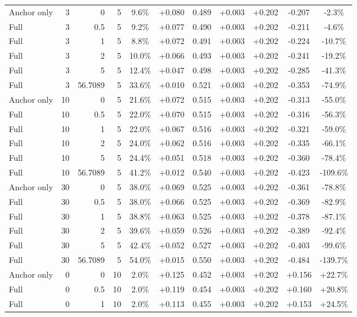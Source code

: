 \begin{table}[htbp]
\begin{tabular}{lrrrccccccc}
Anchor only & 3 & 0 & 5 & 9.6\% & +0.080 & 0.489 & +0.003 & +0.202 & -0.207 & -2.3\% \\
Full & 3 & 0.5 & 5 & 9.2\% & +0.077 & 0.490 & +0.003 & +0.202 & -0.211 & -4.6\% \\
Full & 3 & 1 & 5 & 8.8\% & +0.072 & 0.491 & +0.003 & +0.202 & -0.224 & -10.7\% \\
Full & 3 & 2 & 5 & 10.0\% & +0.066 & 0.493 & +0.003 & +0.202 & -0.241 & -19.2\% \\
Full & 3 & 5 & 5 & 12.4\% & +0.047 & 0.498 & +0.003 & +0.202 & -0.285 & -41.3\% \\
Full & 3 & 56.7089 & 5 & 33.6\% & +0.010 & 0.521 & +0.003 & +0.202 & -0.353 & -74.9\% \\
Anchor only & 10 & 0 & 5 & 21.6\% & +0.072 & 0.515 & +0.003 & +0.202 & -0.313 & -55.0\% \\
Full & 10 & 0.5 & 5 & 22.0\% & +0.070 & 0.515 & +0.003 & +0.202 & -0.316 & -56.3\% \\
Full & 10 & 1 & 5 & 22.0\% & +0.067 & 0.516 & +0.003 & +0.202 & -0.321 & -59.0\% \\
Full & 10 & 2 & 5 & 24.0\% & +0.062 & 0.516 & +0.003 & +0.202 & -0.335 & -66.1\% \\
Full & 10 & 5 & 5 & 24.4\% & +0.051 & 0.518 & +0.003 & +0.202 & -0.360 & -78.4\% \\
Full & 10 & 56.7089 & 5 & 41.2\% & +0.012 & 0.540 & +0.003 & +0.202 & -0.423 & -109.6\% \\
Anchor only & 30 & 0 & 5 & 38.0\% & +0.069 & 0.525 & +0.003 & +0.202 & -0.361 & -78.8\% \\
Full & 30 & 0.5 & 5 & 38.0\% & +0.066 & 0.525 & +0.003 & +0.202 & -0.369 & -82.9\% \\
Full & 30 & 1 & 5 & 38.8\% & +0.063 & 0.525 & +0.003 & +0.202 & -0.378 & -87.1\% \\
Full & 30 & 2 & 5 & 39.6\% & +0.059 & 0.526 & +0.003 & +0.202 & -0.389 & -92.4\% \\
Full & 30 & 5 & 5 & 42.4\% & +0.052 & 0.527 & +0.003 & +0.202 & -0.403 & -99.6\% \\
Full & 30 & 56.7089 & 5 & 54.0\% & +0.015 & 0.550 & +0.003 & +0.202 & -0.484 & -139.7\% \\
Anchor only & 0 & 0 & 10 & 2.0\% & +0.125 & 0.452 & +0.003 & +0.202 & +0.156 & +22.7\% \\
Full & 0 & 0.5 & 10 & 2.0\% & +0.119 & 0.454 & +0.003 & +0.202 & +0.160 & +20.8\% \\
Full & 0 & 1 & 10 & 2.0\% & +0.113 & 0.455 & +0.003 & +0.202 & +0.153 & +24.5\% \\

\end{tabular}
\end{table}
